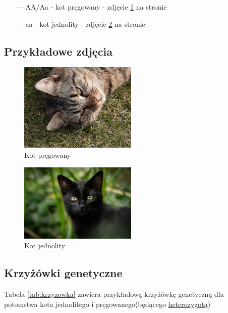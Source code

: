 \begin{flushleft}
\begin{itemize}
\item[—] AA/Aa - kot pręgowany - zdjęcie \ref{fig:kot-pregowany} na stronie \pageref{fig:kot-pregowany}
\item[—] aa - kot jednolity - zdjęcie \ref{fig:kot-jednolity} na stronie \pageref{fig:kot-jednolity}
\end{itemize}
\clearpage

\subsection{Przykładowe zdjęcia}

\begin{figure}[h]
    \centering
    \includegraphics[width=0.5\textwidth]{pictures/kotpregowany.jpg}
    \caption{Kot pręgowany}
    \label{fig:kot-pregowany}
\end{figure}

\begin{figure}[h]
    \centering
    \includegraphics[width=0.5\textwidth]{pictures/kotjednolity.jpg}
    \caption{Kot jednolity}
    \label{fig:kot-jednolity}
\end{figure}


\subsection{Krzyżówki genetyczne}
Tabela \ref{tab:krzyzowka} zawiera przykładową krzyżówkę genetyczną dla potomstwa kota jednolitego i pręgowanego(będącego \underline{heterozygotą})



\end{flushleft}
